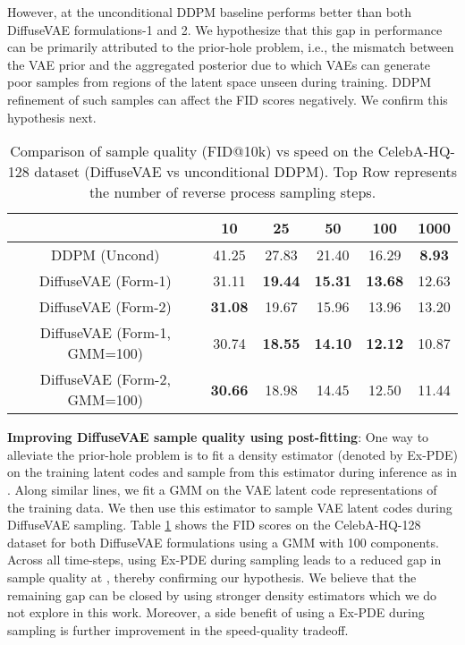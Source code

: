 \documentclass[10pt]{article} \usepackage[accepted]{tmlr}
\begin{document}
However, at  the unconditional DDPM baseline performs better than both DiffuseVAE formulations-1 and 2. We hypothesize that this gap in performance can be primarily attributed to the prior-hole problem, i.e., the mismatch between the VAE prior  and the aggregated posterior  \citep{BauMni18, dai2019diagnosing, Ghosh2020FromVT} due to which VAEs can generate poor samples from regions of the latent space unseen during training. DDPM refinement of such samples can affect the FID scores negatively. We confirm this hypothesis next.

\begin{table}[]
\scriptsize
\centering
\begin{tabular}{@{}cccccc@{}}
\toprule
                             & 10             & 25             & 50             & 100            & 1000          \\ \midrule
DDPM (Uncond)                & 41.25          & 27.83          & 21.40          & 16.29          & \textbf{8.93} \\\midrule
DiffuseVAE (Form-1)          & 31.11          & \textbf{19.44}          & \textbf{15.31}          & \textbf{13.68}          & 12.63         \\
DiffuseVAE (Form-2)          & \textbf{31.08}          & 19.67          & 15.96          & 13.96          & 13.20         \\ \midrule
DiffuseVAE (Form-1, GMM=100) & 30.74          & \textbf{18.55} & \textbf{14.10} & \textbf{12.12} & 10.87         \\
DiffuseVAE (Form-2, GMM=100) & \textbf{30.66} & 18.98          & 14.45          & 12.50          & 11.44\\\bottomrule
\end{tabular}
\caption{Comparison of sample quality (FID@10k) vs speed on the CelebA-HQ-128 dataset (DiffuseVAE vs unconditional DDPM). Top Row represents the number of reverse process sampling steps.}
\label{table:svq_1}
\end{table}

\textbf{Improving DiffuseVAE sample quality using post-fitting}: One way to alleviate the prior-hole problem is to fit a density estimator (denoted by Ex-PDE) on the training latent codes and sample from this estimator during inference as in \citep{10.5555/3295222.3295378,razavi2019generating, Ghosh2020FromVT}. Along similar lines, we fit a GMM on the VAE latent code representations of the training data. We then use this estimator to sample VAE latent codes during DiffuseVAE sampling. Table \ref{table:svq_1} shows the FID scores on the CelebA-HQ-128 dataset for both DiffuseVAE formulations using a GMM with 100 components. Across all time-steps, using Ex-PDE during sampling leads to a reduced gap in sample quality at , thereby confirming our hypothesis. We believe that the remaining gap can be closed by using stronger density estimators which we do not explore in this work. Moreover, a side benefit of using a Ex-PDE during sampling is further improvement in the speed-quality tradeoff.
\end{document}
